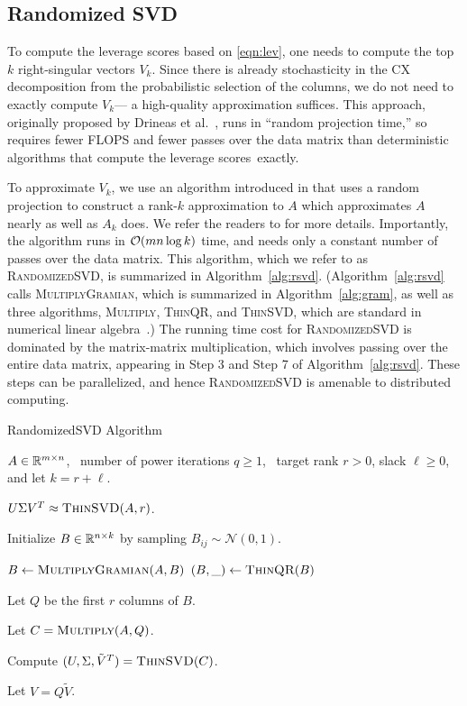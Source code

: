 \subsection{Randomized SVD}

To compute the leverage scores based on \eqref{eqn:lev}, one needs to compute
the top $k$ right-singular vectors $V_k$. Since there is already stochasticity
in the CX decomposition from the probabilistic selection of the columns, we do
not need to exactly compute $V_k$--- a high-quality approximation suffices.
This approach, originally proposed by Drineas et al.~\cite{DMMW12_JMLR}, runs
in ``random projection time,'' so requires fewer FLOPS and fewer passes over
the data matrix than deterministic algorithms that compute the leverage
scores~exactly.

To approximate $V_k$, we use an algorithm introduced in \cite{MRT06,MRT11}
that uses a random projection to construct a rank-$k$ approximation to $A$
which approximates $A$ nearly as well as $A_k$ does.  We refer the readers to
\cite{HMT09_SIREV,Mah-mat-rev_BOOK} for more details.  Importantly, the
algorithm runs in $\operatorname{\mathcal{O}}(mn \log k)$ time, and needs only a
constant number of passes over the data matrix.  This algorithm, which
we refer to as \textsc{RandomizedSVD}, is summarized in
Algorithm~\ref{alg:rsvd}.  (Algorithm~\ref{alg:rsvd} calls
\textsc{MultiplyGramian}, which is summarized in Algorithm~\ref{alg:gram}, as
well as three algorithms, \textsc{Multiply}, \textsc{ThinQR}, and
\textsc{ThinSVD}, which are standard in numerical linear algebra~\cite{GVL96}.)
The running time cost for \textsc{RandomizedSVD} is dominated by the
matrix-matrix multiplication, which involves passing over the entire data
matrix, appearing in Step 3 and Step 7 of Algorithm~\ref{alg:rsvd}.  
These steps can be parallelized, and hence \textsc{RandomizedSVD} is 
amenable to distributed computing.

\begin{algorithm}[tb]
 \caption{{\sc RandomizedSVD} Algorithm}
  \label{alg:rsvd}
  \begin{algorithmic}[1]
    \Require $A \in \mathbb{R}^{m\times n}$, \
      number of power iterations $q \ge 1$, \
      target rank $r > 0$, slack $\ell \ge 0$, and let $k=r+\ell$.

    \Ensure $U \Sigma V^T \approx \Call{ThinSVD}{A, r}$.

    \State Initialize $B \in \mathbb{R}^{n\times k}$ by sampling $B_{ij} \sim \mathcal{N}(0, 1)$.

    \For{$q$ times}
        \State $B \gets \Call{MultiplyGramian}{A, B}$
        \State $(B, \_) \gets \Call{ThinQR}{B}$
    \EndFor

    \State Let $Q$ be the first $r$ columns of $B$.

    \State Let $C = \Call{Multiply}{A, Q}$.

    \State Compute $(U, \Sigma, \tilde V^T) = \Call{ThinSVD}{C}$.

    \State Let $V = Q \tilde V$.

    \end{algorithmic}
\end{algorithm}

